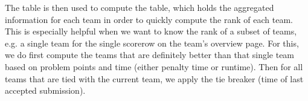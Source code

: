\documentclass[a4paper,10pt,english,openany]{sphinxmanual}
\begin{document}
\sphinxAtStartPar
The  table is then used to compute the  table, which holds the aggregated information for each
team in order to quickly compute the rank of each team. This is especially helpful when we want to know the rank of a
subset of teams, e.g. a single team for the single scorerow on the team’s overview page. For this, we do first compute
the teams that are definitely better than that single team based on problem points and time (either penalty time or
runtime). Then for all teams that are tied with the current team, we apply the tie breaker (time of last accepted
submission).



\renewcommand{\indexname}{Index}
\printindex
\end{document}

